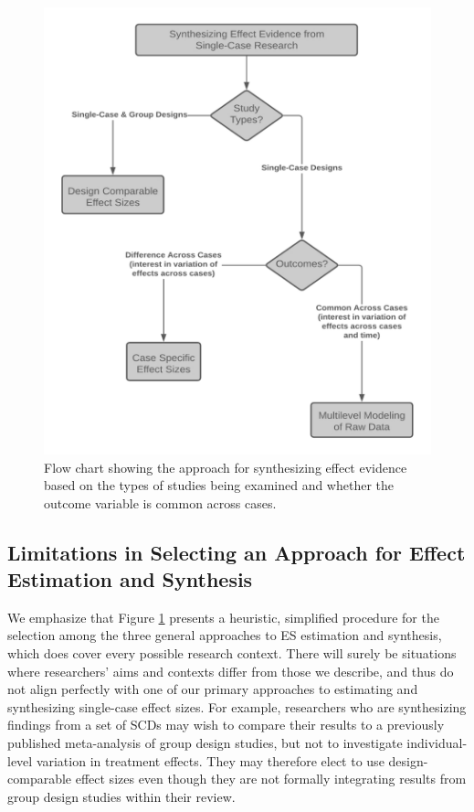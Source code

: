 \documentclass[
]{book}
\begin{document}
\begin{figure}
\centering
\includegraphics{images/Synthesis-flow-chart.png}
\caption{\label{fig:synthesis-flow-chart}Flow chart showing the approach for synthesizing effect evidence based on the types of studies being examined and whether the outcome variable is common across cases.}
\end{figure}

\hypertarget{limitations-in-selecting-an-approach-for-effect-estimation-and-synthesis}{%
\subsection{Limitations in Selecting an Approach for Effect Estimation and Synthesis}\label{limitations-in-selecting-an-approach-for-effect-estimation-and-synthesis}}

We emphasize that Figure \ref{fig:synthesis-flow-chart} presents a heuristic, simplified procedure for the selection among the three general approaches to ES estimation and synthesis, which does cover every possible research context.
There will surely be situations where researchers' aims and contexts differ from those we describe, and thus do not align perfectly with one of our primary approaches to estimating and synthesizing single-case effect sizes.
For example, researchers who are synthesizing findings from a set of SCDs may wish to compare their results to a previously published meta-analysis of group design studies, but not to investigate individual-level variation in treatment effects.
They may therefore elect to use design-comparable effect sizes even though they are not formally integrating results from group design studies within their review.
\end{document}
